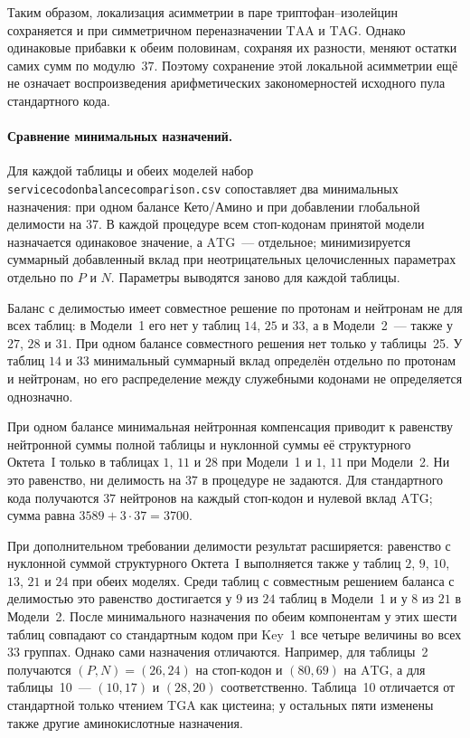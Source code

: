 \documentclass[11pt,a4paper]{article}
\renewcommand{\_}{\origunderscore\allowbreak}
\begin{document}
Таким образом, локализация асимметрии в паре
триптофан--изолейцин сохраняется и при симметричном
переназначении $\mathrm{TAA}$ и $\mathrm{TAG}$.
Однако одинаковые прибавки к обеим половинам,
сохраняя их разности, меняют остатки самих сумм
по модулю~$37$. Поэтому сохранение этой локальной
асимметрии ещё не означает воспроизведения
арифметических закономерностей исходного пула
стандартного кода.

\paragraph{Сравнение минимальных назначений.}
Для каждой таблицы и обеих моделей набор
\texttt{service\_codon\_balance\_comparison.csv}
сопоставляет два минимальных назначения: при одном
балансе Кето/Амино и при добавлении глобальной
делимости на $37$. В каждой процедуре всем
стоп-кодонам принятой модели назначается одинаковое
значение, а $\mathrm{ATG}$~--- отдельное;
минимизируется суммарный добавленный вклад при
неотрицательных целочисленных параметрах отдельно
по $P$ и $N$. Параметры выводятся заново для каждой
таблицы.

Баланс с делимостью имеет совместное решение
по протонам и нейтронам не для всех таблиц:
в Модели~1 его нет у таблиц $14$, $25$ и $33$,
а в Модели~2~--- также у $27$, $28$ и $31$.
При одном балансе совместного решения нет только
у таблицы~25. У таблиц $14$ и $33$ минимальный
суммарный вклад определён отдельно по протонам
и нейтронам, но его распределение между служебными
кодонами не определяется однозначно.

При одном балансе минимальная нейтронная компенсация
приводит к равенству нейтронной суммы полной таблицы
и нуклонной суммы её структурного Октета~I только
в таблицах $1$, $11$ и $28$ при Модели~1 и
$1$, $11$ при Модели~2. Ни это равенство, ни
делимость на $37$ в процедуре не задаются.
Для стандартного кода получаются $37$ нейтронов
на каждый стоп-кодон и нулевой вклад $\mathrm{ATG}$;
сумма равна $3589+3\cdot37=3700$.

При дополнительном требовании делимости результат
расширяется: равенство с нуклонной суммой структурного
Октета~I выполняется также у таблиц
$2$, $9$, $10$, $13$, $21$ и $24$ при обеих моделях.
Среди таблиц с совместным решением баланса
с делимостью это равенство достигается у $9$ из $24$
таблиц в Модели~1 и у $8$ из $21$ в Модели~2.
После минимального назначения по обеим компонентам
у этих шести таблиц совпадают со стандартным кодом
при Key~1 все четыре величины во всех $33$ группах.
Однако сами назначения отличаются. Например, для
таблицы~2 получаются $(P,N)=(26,24)$ на стоп-кодон
и $(80,69)$ на $\mathrm{ATG}$, а для таблицы~10~---
$(10,17)$ и $(28,20)$ соответственно. Таблица~10
отличается от стандартной только чтением
$\mathrm{TGA}$ как цистеина; у остальных пяти
изменены также другие аминокислотные назначения.
\end{document}
